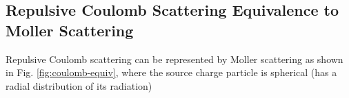 \subsection{Repulsive Coulomb Scattering Equivalence to Moller Scattering}
Repulsive Coulomb scattering can be represented by Moller scattering as shown in Fig. \ref{fig:coulomb-equiv}, where the source charge particle is spherical (has a radial distribution of its radiation)
\begin{figure}[H]
    \centering
{} %

\begin{tikzpicture}[x=0.75pt,y=0.75pt,yscale=-1,xscale=1]


\end{tikzpicture}
\end{figure}
